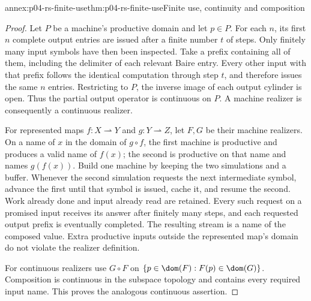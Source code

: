 
\begin{annexitem}{annex:p04-rs-finite-use}{thm:p04-rs-finite-use}{Finite use, continuity and composition}
\begin{proof}
Let \(P\) be a machine's productive domain and let \(p\in P\).
For each \(n\), its first \(n\) complete output entries are issued
after a finite number \(t\) of steps. Only finitely many input symbols
have then been inspected. Take a prefix containing all of them,
including the delimiter of each relevant Baire entry.
Every other input with that prefix follows the identical computation
through step \(t\), and therefore issues the same \(n\) entries.
Restricting to \(P\), the inverse image of each output cylinder is
open. Thus the partial output operator is continuous on \(P\).
A machine realizer is consequently a continuous realizer.

For represented maps \(f:X\rightharpoonup Y\) and
\(g:Y\rightharpoonup Z\), let \(F,G\) be their machine realizers.
On a name of \(x\) in the domain of \(g\circ f\), the first machine
is productive and produces a valid name of \(f(x)\); the second
is productive on that name and names \(g(f(x))\).
Build one machine by keeping the two simulations and a buffer.
Whenever the second simulation requests the next intermediate
symbol, advance the first until that symbol is issued, cache it,
and resume the second. Work already done and input already read
are retained. Every such request on a promised input receives its
answer after finitely many steps, and each requested output prefix
is eventually completed. The resulting stream is a name of the
composed value. Extra productive inputs outside the represented
map's domain do not violate the realizer definition.

For continuous realizers use \(G\circ F\) on
\(\{p\in\dom(F):F(p)\in\dom(G)\}\). Composition is continuous
in the subspace topology and contains every required input name.
This proves the analogous continuous assertion.
\end{proof}
\end{annexitem}

